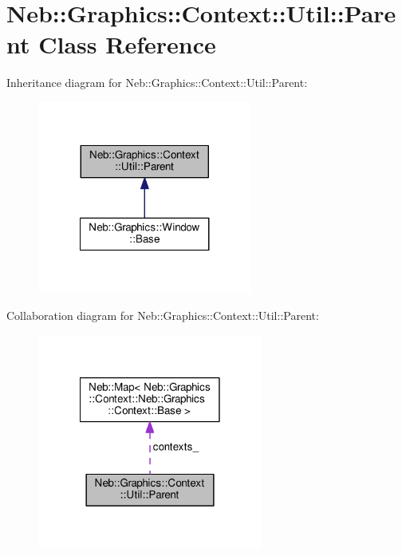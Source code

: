 \hypertarget{classNeb_1_1Graphics_1_1Context_1_1Util_1_1Parent}{\section{Neb\-:\-:Graphics\-:\-:Context\-:\-:Util\-:\-:Parent Class Reference}
\label{classNeb_1_1Graphics_1_1Context_1_1Util_1_1Parent}
}


Inheritance diagram for Neb\-:\-:Graphics\-:\-:Context\-:\-:Util\-:\-:Parent\-:
\nopagebreak
\begin{figure}[H]
\begin{center}
\leavevmode
\includegraphics[width=200pt]{classNeb_1_1Graphics_1_1Context_1_1Util_1_1Parent__inherit__graph}
\end{center}
\end{figure}


Collaboration diagram for Neb\-:\-:Graphics\-:\-:Context\-:\-:Util\-:\-:Parent\-:
\nopagebreak
\begin{figure}[H]
\begin{center}
\leavevmode
\includegraphics[width=210pt]{classNeb_1_1Graphics_1_1Context_1_1Util_1_1Parent__coll__graph}
\end{center}
\end{figure}
